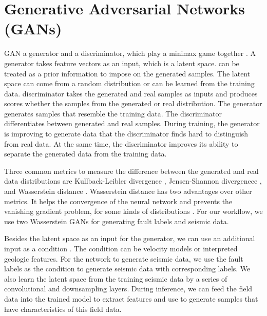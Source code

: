 \section{Generative Adversarial Networks (GANs)}
GAN a generator and a discriminator, which play a minimax game together \cite[]{goodfellow2014}.  A generator takes feature vectors as an input, which is a latent space.  can be treated as a prior information to impose on the generated samples. The latent space can come from a random distribution or can be learned from the training data. discriminator takes the generated and real samples as inputs and produces scores whether the samples  from the generated or real distribution. The generator generates samples that resemble the training data. The discriminator differentiates between  generated and real samples. During training, the generator is improving to generate data that the discriminator finds hard to distinguish from real data. At the same time, the discriminator improves its ability to separate the generated data from the training data.

Three common metrics to measure the difference between the generated and real data distributions are Kullback-Leibler divergence \cite[]{kullback1959}, Jensen-Shannon divergenece \cite[]{dagan1997,endres2003}, and Wasserstein distance \cite[]{kantorovich1960}. Wasserstein distance has two advantages over other metrics. It helps the convergence of the neural network and prevents the vanishing gradient problem, for some kinds of distributions \cite[]{arjovsky2017}. For our workflow, we use two Wasserstein GANs \cite[]{arjovsky2017} for generating fault labels and seismic data.    

Besides the latent space as an input for the generator, we can use an additional input as a condition \cite[]{mirza2014,isola2017}. The condition can be velocity models \cite[]{kaur2020} or interpreted geologic features. For the network to generate seismic data, we use the fault labels as the condition to generate seismic data with corresponding labels. We also learn the latent space from the training seismic data by a series of convolutional and downsampling layers. During inference, we can feed the field data into the trained model to extract features and use  to generate samples that have characteristics of this field data.

